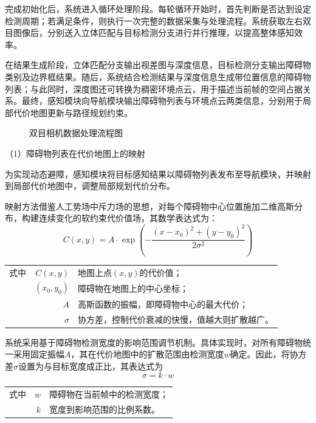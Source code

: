 完成初始化后，系统进入循环处理阶段。每轮循环开始时，首先判断是否达到设定检测周期；若满足条件，则执行一次完整的数据采集与处理流程。系统获取左右双目图像后，分别送入立体匹配与目标检测分支进行并行推理，以提高整体感知效率。

在结果生成阶段，立体匹配分支输出视差图与深度信息，目标检测分支输出障碍物类别及边界框结果。随后，系统结合检测结果与深度信息生成带位置信息的障碍物列表；与此同时，深度图还可转换为稠密环境点云，用于描述当前帧的空间占据关系。最终，感知模块向导航模块输出障碍物列表与环境点云两类信息，分别用于局部代价地图更新与路径规划约束。

\begin{figure}[h]
\centering

\caption{双目相机数据处理流程图}
\label{双目相机数据处理流程图}
\end{figure}

（1）障碍物列表在代价地图上的映射

为实现动态避障，感知模块将目标感知结果以障碍物列表发布至导航模块，并映射到局部代价地图中，调整局部规划代价分布。

映射方法借鉴人工势场中斥力场的思想，对每个障碍物中心位置施加二维高斯分布，构建连续变化的软约束代价值场，其数学表达式为：
\begin{equation}
C(x,y) = A \cdot \exp\left( - \frac{(x - x_{0})^{2} + (y - y_{0})^{2}}{2\sigma^{2}} \right)
\end{equation}
\begin{tabularx}{\textwidth}{@{}l@{\quad}r@{———}X@{}}
式中& $C(x,y)$ & 地图上点$(x,y)$的代价值；\\
& $(x_0,y_0)$ & 障碍物在地图上的中心坐标；\\
& $A$ & 高斯函数的振幅，即障碍物中心的最大代价；\\
& $\sigma$ & 协方差，控制代价衰减的快慢，值越大则扩散越广。\\
\end{tabularx}\vspace{3.15bp}

系统采用基于障碍物检测宽度的影响范围调节机制。具体实现时，对所有障碍物统一采用固定振幅$A$，其在代价地图中的扩散范围由检测宽度$w$确定。因此，将协方差$\sigma$设置为与目标宽度成正比，其表达式为
\begin{equation}
\sigma=k\cdot w
\end{equation}
\begin{tabularx}{\textwidth}{@{}l@{\quad}r@{———}X@{}}
式中& $w$ & 障碍物在当前帧中的检测宽度；\\
& $k$ & 宽度到影响范围的比例系数。\\
\end{tabularx}\vspace{3.15bp}

